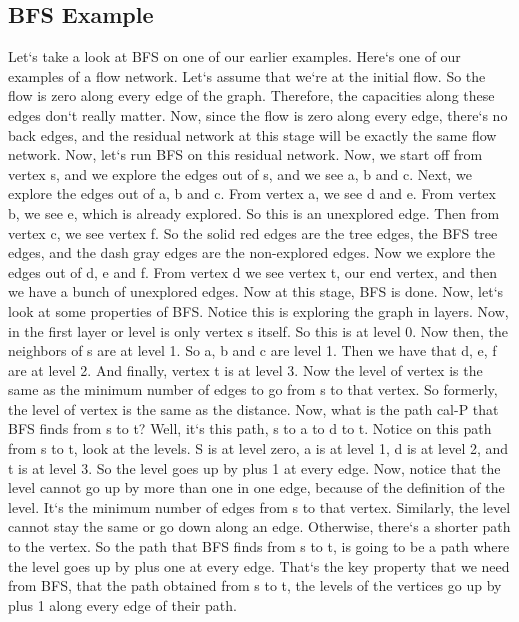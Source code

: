 \subsection{BFS Example}
Let`s take a look at BFS on one of our earlier examples.
Here`s one of our examples of a flow network.
Let`s assume that we`re at the initial flow.
So the flow is zero along every edge of the graph.
Therefore, the capacities along these edges don`t really matter.
Now, since the flow is zero along every edge, there`s no back edges, and the residual network at this stage will be exactly the same flow network.
Now, let`s run BFS on this residual network.
Now, we start off from vertex s, and we explore the edges out of s, and we see a, b and c.
Next, we explore the edges out of a, b and c.
From vertex a, we see d and e.
From vertex b, we see e, which is already explored.
So this is an unexplored edge.
Then from vertex c, we see vertex f.
So the solid red edges are the tree edges, the BFS tree edges, and the dash gray edges are the non-explored edges.
Now we explore the edges out of d, e and f.
From vertex d we see vertex t, our end vertex, and then we have a bunch of unexplored edges.
Now at this stage, BFS is done.
Now, let`s look at some properties of BFS\@.
Notice this is exploring the graph in layers.
Now, in the first layer or level is only vertex s itself.
So this is at level 0.
Now then, the neighbors of s are at level 1.
So a, b and c are level 1.
Then we have that d, e, f are at level 2.
And finally, vertex t is at level 3.
Now the level of vertex is the same as the minimum number of edges to go from s to that vertex.
So formerly, the level of vertex is the same as the distance.
Now, what is the path cal-P that BFS finds from s to t? Well, it`s this path, s to a to d to t.
Notice on this path from s to t, look at the levels.
S is at level zero, a is at level 1, d is at level 2, and t is at level 3.
So the level goes up by plus 1 at every edge.
Now, notice that the level cannot go up by more than one in one edge, because of the definition of the level.
It`s the minimum number of edges from s to that vertex.
Similarly, the level cannot stay the same or go down along an edge.
Otherwise, there`s a shorter path to the vertex.
So the path that BFS finds from s to t, is going to be a path where the level goes up by plus one at every edge.
That`s the key property that we need from BFS, that the path obtained from s to t, the levels of the vertices go up by plus 1 along every edge of their path.

